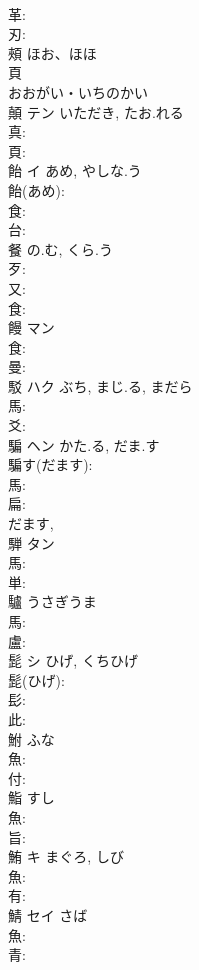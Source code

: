\documentclass[8pt]{extreport}
\begin{document}
\begin{CJK}{UTF8}{min}
\\	革: 
\\	刃: 
\\	頰		ほお、ほほ		
\\	頁	
\\	おおがい・いちのかい	
\\	顛	テン	いただき, たお.れる		
\\	真: 
\\	頁: 
\\	飴	イ	あめ, やしな.う		
\\	飴(あめ): 
\\	食: 
\\	台: 
\\	餐		の.む, くら.う				
\\	歹: 
\\	又: 
\\	食: 
\\	饅	マン			
\\	食: 
\\	曼: 
\\	駁	ハク	ぶち, まじ.る, まだら		
\\	馬: 
\\	爻: 
\\	騙	ヘン	かた.る, だま.す		
\\	騙す(だます): 
\\	馬: 
\\	扁: 
\\	だます, 
\\	騨	タン			
\\	馬: 
\\	単: 
\\	驢		うさぎうま				
\\	馬: 
\\	盧: 
\\	髭	シ	ひげ, くちひげ		
\\	髭(ひげ): 
\\	髟: 
\\	此: 
\\	鮒		ふな				
\\	魚: 
\\	付: 
\\	鮨		すし				
\\	魚: 
\\	旨: 
\\	鮪	キ	まぐろ, しび		
\\	魚: 
\\	有: 
\\	鯖	セイ	さば		
\\	魚: 
\\	青: 

\end{CJK}
\end{document}
